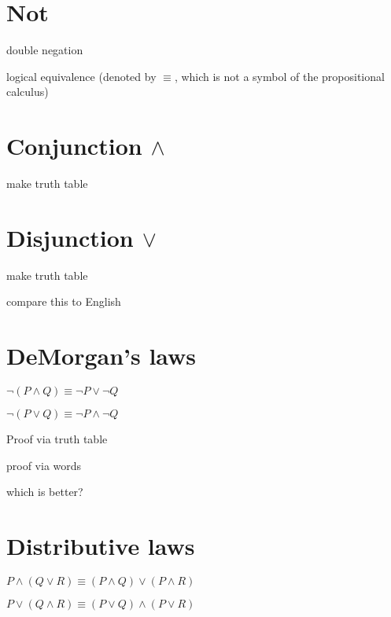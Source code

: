 \documentclass[12pt]{handout}
\begin{document}
\section*{Not}

double negation

logical equivalence (denoted by $\equiv$, which is not a symbol of the
propositional calculus)

\section*{Conjunction $\wedge$}

make truth table

\section*{Disjunction $\vee$}

make truth table

compare this to English

\section*{DeMorgan's laws}

$\neg (P \wedge Q) \equiv \neg P \vee \neg Q$

$\neg (P \vee Q) \equiv \neg P \wedge \neg Q$

Proof via truth table

proof via words

which is better?

\section*{Distributive laws}

$P \wedge (Q \vee R) \equiv (P \wedge Q) \vee (P \wedge R)$

$P \vee (Q \wedge R) \equiv (P \vee Q) \wedge (P \vee R)$
\end{document}
